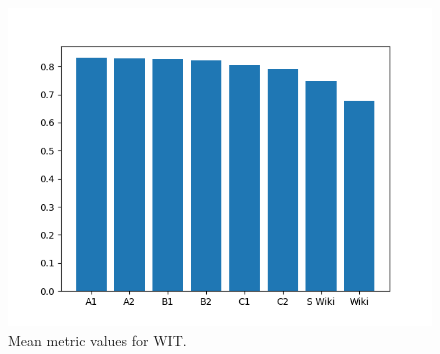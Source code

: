 \begin{figure}[h]
    \centering
    \includegraphics[width=\columnwidth]{figs/assets/plot-WIT.png}
    \caption{Mean metric values for WIT.}
    \label{fig:wit-mean}
\end{figure}